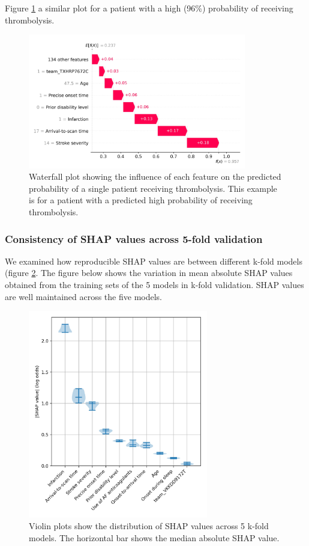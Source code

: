 Figure \ref{fig:waterfall_high} a similar plot for a patient with a high (96\%) probability of receiving thrombolysis.

\begin{figure}
\centering
\includegraphics[width=0.85\textwidth]{./images/03_xgb_10_features_waterfall_probability_high}
\caption{Waterfall plot showing the influence of each feature on the predicted probability of a single patient receiving thrombolysis. This example is for a patient with a predicted high probability of receiving thrombolysis.}
\label{fig:waterfall_high}
\end{figure}

\subsubsection{Consistency of SHAP values across 5-fold validation}

We examined how reproducible SHAP values are between different k-fold models (figure \ref{fig:shap_consistency}. The figure below shows the variation in mean absolute SHAP values obtained from the training sets of the 5 models in k-fold validation. SHAP values are well maintained across the five models.

\begin{figure}
\centering
\includegraphics[width=0.7\textwidth]{./images/03_xgb_10_features_shap_violin}
\caption{Violin plots show the distribution of SHAP values across 5 k-fold models. The horizontal bar shows the median absolute SHAP value.}
\label{fig:shap_consistency}
\end{figure}

